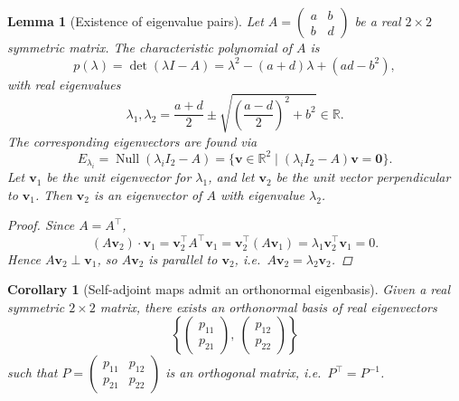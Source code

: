 \documentclass[10pt, a4paper]{article}
\newcommand{\R}{\mathbb{R}}
\theoremstyle{plain}
\newtheorem{lemma}[theorem]{Lemma}
\newtheorem{corollary}[theorem]{Corollary}
\theoremstyle{definition}
\theoremstyle{remark}
\begin{document}
\begin{lemma}[Existence of eigenvalue pairs]
  Let $A = \begin{pmatrix} a & b \\ b & d \end{pmatrix}$ be a real $2 \times 2$ symmetric matrix.
  The characteristic polynomial of $A$ is
  \[
    p(\lambda) = \det(\lambda I - A) = \lambda^2 - (a+d)\lambda + (ad - b^2),
  \]
  with real eigenvalues
  \[
    \lambda_1, \lambda_2 = \frac{a+d}{2} \pm \sqrt{\left(\frac{a-d}{2}\right)^2 + b^2} \in \R.
  \]
  The corresponding eigenvectors are found via
  \[
    E_{\lambda_i} = \operatorname{Null}(\lambda_i I_2 - A)
    = \{\mathbf{v} \in \mathbb{R}^2 \mid (\lambda_i I_2 - A)\mathbf{v} = \mathbf{0}\}.
  \]
  Let $\mathbf{v}_1$ be the unit eigenvector for $\lambda_1$, and let $\mathbf{v}_2$ be the unit
  vector perpendicular to $\mathbf{v}_1$. Then $\mathbf{v}_2$ is an eigenvector of $A$ with
  eigenvalue $\lambda_2$.

  \begin{proof}
  Since $A = A^\top$,
  \[
    (A\mathbf{v}_2) \cdot \mathbf{v}_1
    = \mathbf{v}_2^\top A^\top \mathbf{v}_1
    = \mathbf{v}_2^\top (A\mathbf{v}_1)
    = \lambda_1 \mathbf{v}_2^\top \mathbf{v}_1 = 0.
  \]
  Hence $A\mathbf{v}_2 \perp \mathbf{v}_1$, so $A\mathbf{v}_2$ is parallel to $\mathbf{v}_2$,
  i.e.\ $A\mathbf{v}_2 = \lambda_2 \mathbf{v}_2$.
\end{proof}

\end{lemma}


\begin{corollary}[Self-adjoint maps admit an orthonormal eigenbasis]
  Given a real symmetric $2 \times 2$ matrix, there exists an orthonormal basis of real
  eigenvectors
  \[
    \left\{
      \begin{pmatrix} p_{11} \\ p_{21} \end{pmatrix},\
      \begin{pmatrix} p_{12} \\ p_{22} \end{pmatrix}
    \right\}
  \]
  such that $P = \begin{pmatrix} p_{11} & p_{12} \\ p_{21} & p_{22} \end{pmatrix}$
  is an orthogonal matrix, i.e.\ $P^\top = P^{-1}$.
\end{corollary}
\end{document}

